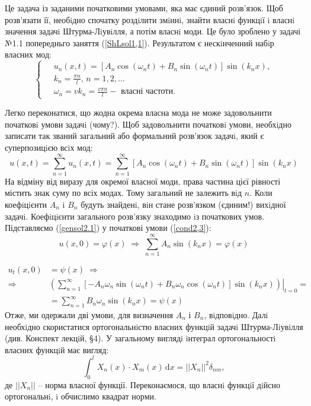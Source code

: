 Це задача із заданими початковими умовами, яка має єдиний розв'язок. Щоб розв’язати її, необiдно спочатку роздiлити змiннi, знайти власнi функцiї i власнi значення задачi Штурма-Лiувiлля, а потім  власнi моди. Це було зроблено у  задачі №1.1 попередньго заняття (\ref{ShLsol1,1}). Результатом є нескiнченний набiр власних мод: 
\begin{equation}
    \left\{ \begin{aligned} \label{mode2.1}
        \;&u_n(x,t) = \left[A_n\cos(\omega_n t) + B_n\sin(\omega_n t)\right] \sin(k_n x), \\
        &k_n = \frac{\pi n}{l}, \, n = 1, 2,\ldots\\
        &\omega_n = vk_n = \frac{v \pi n}{l} - \text{ власні частоти}.
    \end{aligned}\right.
\end{equation}

Легко переконатися, що жодна окрема власна мода не може задовольнити початковi умови задачi (чому?). Щоб задовольнити початковi умови, необхiдно записати так званий загальний або формальний розв’язок задачi, який є суперпозицiєю всiх мод:
\begin{equation} \label{gensol2.1}
    u(x,t) = \sum^{\infty}_{n=1} u_n(x,t) = \sum^{\infty}_{n=1} \left[A_n\cos(\omega_n t) + B_n\sin(\omega_n t)\right] \sin(k_n x)
\end{equation}
На відміну від виразу для окремої власної моди, права частина цієї рівності містить знак суму по всіх модах. Тому загальний не залежить вiд $n$. Коли коефiцiєнти $A_n$ i $B_n$ будуть знайденi, вiн стане розв’язком (єдиним!) вихiдної задачi. Коефiцiєнти загального розв’язку знаходимо iз початкових умов. Підставляємо (\ref{gensol2.1}) у початкові умови (\ref{cond2,3}):
\begin{equation} \label{init-pos2,3}
    u(x,0) = \varphi(x) \;\Rightarrow\; \sum^{\infty}_{n=1} A_n\sin(k_n x) = \varphi(x)
\end{equation}

\begin{equation} \label{init-vel2,3}
    \begin{aligned}
        u_t(x,0) &= \psi(x)
        \;\Rightarrow\\
        \Rightarrow& \left.\left(\sum^{\infty}_{n=1}\left[-A_n\omega_n\sin(\omega_n t) + B_n\omega_n\cos(\omega_n t)\right] \sin(k_n x)\right)\right|_{t=0} =\\
        &= \sum^{\infty}_{n=1} B_n\omega_n\sin(k_n x) = \psi(x)
    \end{aligned}
\end{equation}
Отже, ми одержали дві умови, для визначення $A_n$ і $B_n$, вiдповiдно. Далi необхiдно скористатися ортогональнiстю власних функцiй задачi Штурма-Лiувiлля (див. Конспект лекцiй, §4). У загальному виглядi iнтеграл ортогональностi власних функцiй має вигляд:
\begin{equation} \label{orth2,3}
    \int_0^l X_n(x) \cdot X_m(x) \,\mathrm{d}x = ||X_n||^2\delta_{nm},
\end{equation}
де $||X_n||$ -- норма власної функції. Переконаємося, що власнi функцiї дiйсно ортогональнi, i обчислимо квадрат норми.

